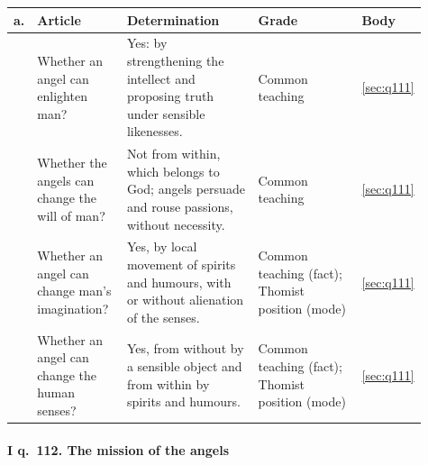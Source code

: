 \begingroup\footnotesize
\begin{longtable}{>{\raggedright\arraybackslash}p{0.03\linewidth}>{\raggedright\arraybackslash}p{0.22\linewidth}>{\raggedright\arraybackslash}p{0.33\linewidth}>{\raggedright\arraybackslash}p{0.27\linewidth}>{\raggedright\arraybackslash}p{0.06\linewidth}}
\toprule
\textbf{a.} & \textbf{Article} & \textbf{Determination} & \textbf{Grade} & \textbf{Body}\\
\midrule
\endhead
1 & Whether an angel can enlighten man? & Yes: by strengthening the intellect and proposing truth under sensible likenesses. & Common teaching & \ref{sec:q111}\\
2 & Whether the angels can change the will of man? & Not from within, which belongs to God; angels persuade and rouse passions, without necessity. & Common teaching & \ref{sec:q111}\\
3 & Whether an angel can change man's imagination? & Yes, by local movement of spirits and humours, with or without alienation of the senses. & Common teaching (fact); Thomist position (mode) & \ref{sec:q111}\\
4 & Whether an angel can change the human senses? & Yes, from without by a sensible object and from within by spirits and humours. & Common teaching (fact); Thomist position (mode) & \ref{sec:q111}\\
\bottomrule
\end{longtable}
\endgroup

\paragraph{I q.~112. The mission of the angels}


